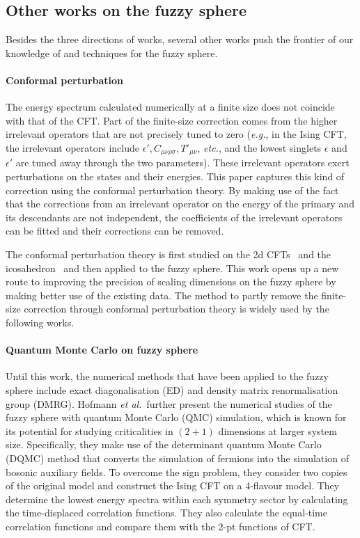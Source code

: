 \documentclass{timesjhep}
\begin{document}
\subsection{Other works on the fuzzy sphere}

Besides the three directions of works, several other works push the frontier of our knowledge of and techniques for the fuzzy sphere.

\paragraph{Conformal perturbation~\cite{Laeuchli2025}}

The energy spectrum calculated numerically at a finite size does not coincide with that of the CFT. Part of the finite-size correction comes from the higher irrelevant operators that are not precisely tuned to zero (\textit{e.g.}, in the Ising CFT, the irrelevant operators include $\epsilon', C_{\mu\nu\rho\sigma}, T'_{\mu\nu}$, \textit{etc.}, and the lowest singlets $\epsilon$ and $\epsilon'$ are tuned away through the two parameters). These irrelevant operators exert perturbations on the states and their energies. This paper captures this kind of correction using the conformal perturbation theory. By making use of the fact that the corrections from an irrelevant operator on the energy of the primary and its descendants are not independent, the coefficients of the irrelevant operators can be fitted and their corrections can be removed.

The conformal perturbation theory is first studied on the 2d CFTs~\cite{Reinicke1987Perturbation1,Reinicke1987Perturbation2} and the icosahedron~\cite{Lao2023} and then applied to the fuzzy sphere. This work opens up a new route to improving the precision of scaling dimensions on the fuzzy sphere by making better use of the existing data. The method to partly remove the finite-size correction through conformal perturbation theory is widely used by the following works.

\paragraph{Quantum Monte Carlo on fuzzy sphere~\cite{Hofmann2023}}

Until this work, the numerical methods that have been applied to the fuzzy sphere include exact diagonalisation (ED) and density matrix renormalisation group (DMRG). Hofmann \textit{et al.}~further present the numerical studies of the fuzzy sphere with quantum Monte Carlo (QMC) simulation, which is known for its potential for studying criticalities in $(2+1)$ dimensions at larger system size. Specifically, they make use of the determinant quantum Monte Carlo (DQMC) method that converts the simulation of fermions into the simulation of bosonic auxiliary fields. To overcome the sign problem, they consider two copies of the original model and construct the Ising CFT on a 4-flavour model. They determine the lowest energy spectra within each symmetry sector by calculating the time-displaced correlation functions. They also calculate the equal-time correlation functions and compare them with the 2-pt functions of CFT.
\end{document}
